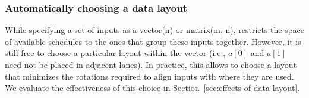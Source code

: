 \subsubsection*{Automatically choosing a data layout}
While specifying a set of inputs as a {\sf vector(n)} or {\sf matrix(m, n)}, \system restricts the space of available schedules to the ones that group these inputs together.
However, it is still free to choose a particular layout within the vector (i.e., $a[0]$ and $a[1]$ need not be placed in adjacent lanes). 
In practice, this allows \system to choose a layout that minimizes the rotations required to align inputs with where they are used.
We evaluate the effectiveness of this choice in Section~\ref{sec:effects-of-data-layout}.



